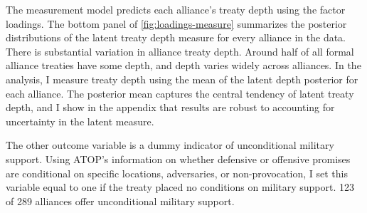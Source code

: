 \documentclass[12pt]{article}
\begin{document}
The measurement model predicts each alliance's treaty depth using the factor loadings. 
The bottom panel of \autoref{fig:loadings-measure} summarizes the posterior distributions of the latent treaty depth measure for every alliance in the data. 
There is substantial variation in alliance treaty depth. 
Around half of all formal alliance treaties have some depth, and depth varies widely across alliances.
In the analysis, I measure treaty depth using the mean of the latent depth posterior for each alliance. 
The posterior mean captures the central tendency of latent treaty depth, and I show in the appendix that results are robust to accounting for uncertainty in the latent measure. 


The other outcome variable is a dummy indicator of unconditional military support. 
Using ATOP's information on whether defensive or offensive promises are conditional on specific locations, adversaries, or non-provocation, I set this variable equal to one if the treaty placed no conditions on military support.
123 of 289 alliances offer unconditional military support. 
\end{document}
